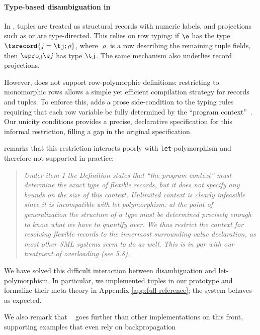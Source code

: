 \documentclass[acmsmall,screen,nonacm%
\Anonymous{,anonymous}{}%
\Final{}{,review}%
]{acmart}
\providecommand{\DIFadd}[1]{\protect\cbstart{\protect\color{blue}#1}\protect\cbend} %
\providecommand{\DIFaddbegin}{} %
\providecommand{\DIFaddend}{} %
\begin{document}
\paragraph{Type-based disambiguation in \SML}

In \SML, tuples are treated as structural records with numeric labels, and
projections such as  or  are type-directed. This relies on
row typing: if $\e$ has the type $\tsrecord {j = \tj; \varrho}$, where
$\varrho$ is a row describing the remaining tuple fields, then $\eproj \e j$
has type $\tj$. The same mechanism also underlies record projections.

However, \SML does not support row-polymorphic definitions: restricting to
monomorphic rows allows a simple yet efficient compilation strategy for records
and tuples. To enforce this, \SML adds a prose side-condition to the typing
rules requiring that each row variable be fully determined by the ``program
context''~\citep*[Section 4.11]{sml-definition}. Our unicity conditions
provides a precise, declarative specification for this informal restriction,
filling a gap in the original specification.

\citet*[page 36]{rossberg-hamlet} remarks that this restriction interacts
poorly with \texttt{let}-polymorphism and therefore not supported in practice:
%
\begin{quotation}\DIFaddbegin \em
  \DIFaddend Under item 1 the Definition states that “the program context” must
  determine the exact type of flexible records, but it does not
  specify any bounds on the size of this context. Unlimited context is
  clearly infeasible since it is incompatible with let polymorphism:
  at the point of generalization the structure of a type must be
  determined precisely enough to know what we have to quantify
  over. We thus restrict the context for resolving flexible records to
  the innermost surrounding value declaration, as most other SML
  systems seem to do as well. This is in par with our treatment of
  overloading (see 5.8).
\end{quotation}
%
We have solved this difficult interaction between disambiguation and
let-polymorphism. In particular, we implemented tuples in our
prototype and formalize their meta-theory in Appendix
\cref{app:full-reference}; the system behaves as expected.

We also remark that \PolySML~\citep*{sml-polyml} goes further than other \SML
implementations on this front, supporting examples that even rely on
backpropagation\DIFaddbegin \DIFadd{:
}\DIFaddend {}
\end{document}
